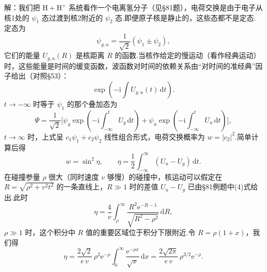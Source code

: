 \begin{xiti}
解：我们把 $\mathrm{H}+\mathrm{H}^+$ 系统看作一个电离氢分子（见§81题），电荷交换是由于电子从核1处的 $\psi_1$ 态过渡到核2附近的 $\psi_2$ 态.即便原子核是静止的，这些态都不是定态.定态为
\begin{equation*}
  \psi_{g,u}=\frac{1}{\sqrt{2}}(\psi_1\pm\psi_2),
\end{equation*}
它们的能量 $U_{g,u}(R)$ 是核距离 $R$ 的函数.当核作给定的慢运动（看作经典运动）时，这些能量是时间的缓变函数，波函数对时间的依赖关系由“对时间的准经典”因子给出（对照§53）：
\begin{equation*}
  \exp\left(-\mathrm{i}\int U_{g,u}(t)\,\mathrm{d}t\right).
\end{equation*}
$t\to-\infty$ 时等于 $\psi_1$ 的那个叠加态为
\begin{equation*}
  \varPsi=\frac{1}{\sqrt{2}}\bigg[\psi_g\exp\left(-\mathrm{i}\int_{-\infty}^t U_g\,\mathrm{d}t\right)
  +\psi_u\exp\left(-\mathrm{i}\int_{-\infty}^t U_u\,\mathrm{d}t\right)\bigg],
\end{equation*}
$t\to\infty$ 时，上式呈 $c_1\psi_1+c_2\psi_2$ 线性组合形式，电荷交换概率为 $w=|c_2|^2$.简单计算后得
\begin{equation*}
  w=\sin^2\eta,\qquad
  \eta=\frac{1}{2}\int_{-\infty}^{\infty}(U_u-U_g)\,\mathrm{d}t.
\end{equation*}
在碰撞参量 $\rho$ 很大（同时速度 $v$ 够慢）的碰撞中，核运动可以假定在 $R=\sqrt{\rho^2+v^2t^2}$ 的一条直线上，$R\gg1$ 时的差值 $U_u-U_g$ 已由§81例题中(4)式给出.此时
\begin{equation*}
  \eta=\frac{4}{v}\int_\rho^\infty
  \frac{R^2\mathrm{e}^{-R-1}}{\sqrt{R^2-\rho^2}}\,\mathrm{d}R,
\end{equation*}
$\rho\gg1$ 时，这个积分中 $R$ 值的重要区域位于积分下限附近.令 $R=\rho(1+x)$，我们得
\begin{equation*}
  \eta=\frac{2\sqrt{2}}{e\,v}\,\rho^2\mathrm{e}^{-\rho}
  \int_0^\infty\frac{\mathrm{e}^{-\rho x}}{\sqrt{x}}\,\mathrm{d}x
  =\frac{2\sqrt{2\pi}}{e\,v}\,\rho^{3/2}\mathrm{e}^{-\rho}.
\end{equation*}

\end{xiti}

